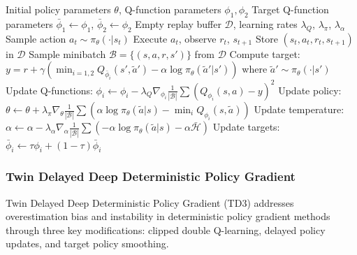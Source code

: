 \begin{algorithm}[htbp]
\caption{Soft Actor-Critic (SAC)}
\label{alg:sac}
\begin{algorithmic}[1]
\Require Initial policy parameters $\theta$, Q-function parameters $\phi_1, \phi_2$
\Require Target Q-function parameters $\bar{\phi}_1 \leftarrow \phi_1$, $\bar{\phi}_2 \leftarrow \phi_2$
\Require Empty replay buffer $\mathcal{D}$, learning rates $\lambda_Q$, $\lambda_\pi$, $\lambda_\alpha$
        \State Sample action $a_t \sim \pi_\theta(\cdot|s_t)$
        \State Execute $a_t$, observe $r_t$, $s_{t+1}$
        \State Store $(s_t, a_t, r_t, s_{t+1})$ in $\mathcal{D}$
    \EndFor
        \State Sample minibatch $\mathcal{B} = \{(s, a, r, s')\}$ from $\mathcal{D}$
        \State Compute target: $y = r + \gamma(\min_{i=1,2} Q_{\bar{\phi}_i}(s', \tilde{a}') - \alpha \log \pi_\theta(\tilde{a}'|s'))$ where $\tilde{a}' \sim \pi_\theta(\cdot|s')$
        \State Update Q-functions: $\phi_i \leftarrow \phi_i - \lambda_Q \nabla_{\phi_i} \frac{1}{|\mathcal{B}|}\sum(Q_{\phi_i}(s,a) - y)^2$
        \State Update policy: $\theta \leftarrow \theta + \lambda_\pi \nabla_\theta \frac{1}{|\mathcal{B}|}\sum(\alpha \log \pi_\theta(\tilde{a}|s) - \min_{i} Q_{\phi_i}(s, \tilde{a}))$
        \State Update temperature: $\alpha \leftarrow \alpha - \lambda_\alpha \nabla_\alpha \frac{1}{|\mathcal{B}|}\sum(-\alpha \log \pi_\theta(\tilde{a}|s) - \alpha \bar{\mathcal{H}})$
        \State Update targets: $\bar{\phi}_i \leftarrow \tau \phi_i + (1-\tau)\bar{\phi}_i$
    \EndFor
\EndFor
\end{algorithmic}
\end{algorithm}

\subsubsection{Twin Delayed Deep Deterministic Policy Gradient}

Twin Delayed Deep Deterministic Policy Gradient (TD3) addresses overestimation bias and instability in deterministic policy gradient methods through three key modifications: clipped double Q-learning, delayed policy updates, and target policy smoothing.

